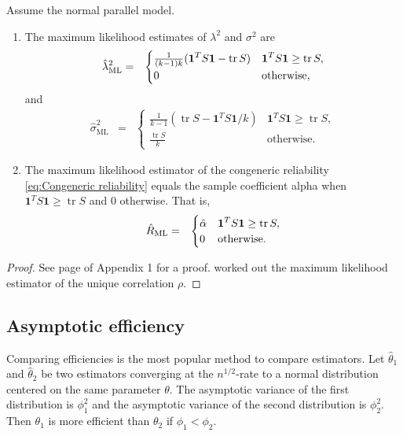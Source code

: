 \documentclass[twoside]{article}
\DeclareMathOperator{\tr}{tr}
\begin{document}
\begin{thm}\label{thm:ML}
Assume the normal parallel model.
\begin{enumerate}[label=(\roman*)]
\item The maximum likelihood estimates of $\lambda^{2}$
and $\sigma^{2}$ are 
\begin{eqnarray*}
\hat{\lambda}^2_\textrm{ML} & = & \begin{cases}
\frac{1}{(k-1)k}(\boldsymbol{1}^{T}S\boldsymbol{1}-\tr{S}) & \boldsymbol{1}^{T}S\boldsymbol{1}\geq\tr{S},\\
0 & \text{\textrm{otherwise}},
\end{cases}\\
\end{eqnarray*}
and
\begin{eqnarray*}
\hat{\sigma}^2_\textrm{ML} & = & \begin{cases}
\frac{1}{k-1}(\tr{S}-\boldsymbol{1}^{T}S\boldsymbol{1}/k) & \boldsymbol{1}^{T}S\boldsymbol{1}\geq\tr{S},\\
\frac{\tr{S}}{k} & \textrm{otherwise}.
\end{cases}
\end{eqnarray*}
\item The maximum likelihood estimator of the congeneric reliability
\eqref{eq:Congeneric reliability} equals the sample coefficient alpha
when $\boldsymbol{1}^{T}S\boldsymbol{1}\geq\tr{S}$ and $0$ otherwise. That is,
\begin{eqnarray*}
\hat{ R}_\textrm{ML} & = & \begin{cases}
\hat{\alpha} & \boldsymbol{1}^{T}S\boldsymbol{1}\geq\tr{S},\\
0 & \text{\textrm{otherwise}}.
\end{cases}
\end{eqnarray*}
\end{enumerate}
\end{thm}
\begin{proof}
See page \pageref{proof:ML} of Appendix 1 for a proof. \citet[][section B]{Kristof1963-tb} worked out the maximum likelihood estimator of the unique correlation $\rho$. 
\end{proof}

\subsection{Asymptotic efficiency}
Comparing efficiencies is the most popular method to compare estimators. Let $\hat{\theta}_1$ and $\hat{\theta}_2$ be two estimators converging at the $n^{1/2}$-rate to a normal distribution centered on the same parameter $\theta$. The asymptotic variance of the first distribution is $\phi_1^2$ and the asymptotic variance of the second distribution is $\phi_2^2$. Then $\theta_1$ is more efficient than $\theta_2$ if $\phi_1<\phi_2$. 
\end{document}
